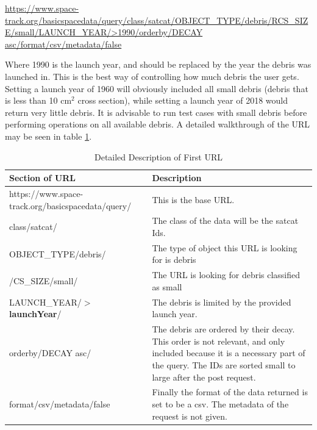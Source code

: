 \documentclass[12pt]{article}
\begin{document}
	\url{https://www.space-track.org/basicspacedata/query/class/satcat/OBJECT_TYPE/debris/RCS_SIZE/small/LAUNCH_YEAR/>1990/orderby/DECAY asc/format/csv/metadata/false}
	
	
	
	
	Where 1990 is the launch year, and should be replaced by the year the debris was launched in. This is the best way of controlling how much debris the user gets. Setting a launch year of 1960 will obviously included all small debris (debris that is less than 10 cm$^2$ cross section), while setting a launch year of 2018 would return very little debris. It is advisable to run test cases with small debris before performing operations on all available debris. A detailed walkthrough of the URL may be seen in table \ref{tab:url1}.\par 
	
	
	\begin{table}[H]\singlespacing
		\caption{Detailed Description of First URL}
		\label{tab:url1}
		\begin{tabular}{|p{6cm}|p{10cm}|}
			\hline
			Section of URL & Description \\ \hline
			https://www.space-track.org/basicspacedata/query/ & This is the base URL. \\ \hline
			class/satcat/ & The class of the data will be the satcat Ids. \\ \hline
			OBJECT\_TYPE/debris/ & The type of object this URL is looking for is debris \\ \hline
			/CS\_SIZE/small/ & The URL is looking for debris classified as small \\ \hline
			LAUNCH\_YEAR/$>$\textbf{launchYear}/ & The debris is limited by the provided launch year. \\ \hline
			orderby/DECAY asc/ & The debris are ordered by their decay. This order is not relevant, and only included because it is a necessary part of the query. The IDs are sorted small to large after the post request. \\ \hline
			format/csv/metadata/false & Finally the format of the data returned is set to be a csv. The metadata of the request is not given. \\ \hline
		\end{tabular}
	\end{table}\doublespacing
	
\end{document}
